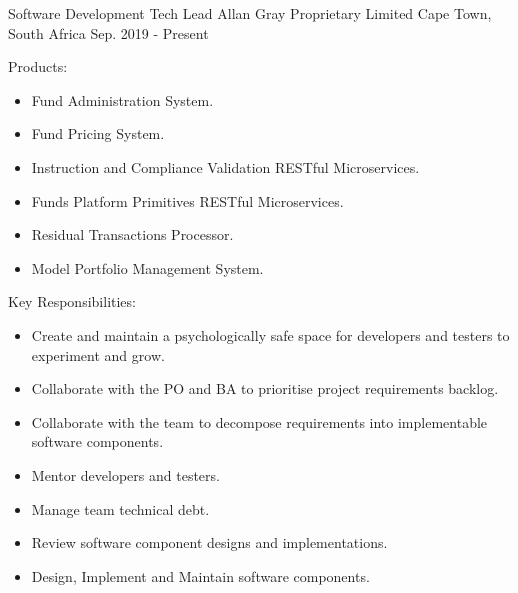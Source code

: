 

\begin{cventries}
  \cventry
    {Software Development Tech Lead} %
    {Allan Gray Proprietary Limited} %
    {Cape Town, South Africa} %
    {Sep. 2019 - Present} %
    {
      \begin{cvitems} %
        \item {Products:}
        \begin{itemize}
          \item {Fund Administration System.}
          \item {Fund Pricing System.}
          \item {Instruction and Compliance Validation RESTful Microservices.}
          \item {Funds Platform Primitives RESTful Microservices.}
          \item {Residual Transactions Processor.}
          \item {Model Portfolio Management System.}
        \end{itemize}
        \item {Key Responsibilities:}
        \begin{itemize}
          \item {Create and maintain a psychologically safe space for developers and testers to experiment and grow.}
          \item {Collaborate with the PO and BA to prioritise project requirements backlog.}
          \item {Collaborate with the team to decompose requirements into implementable software components.}
          \item {Mentor developers and testers.}
          \item {Manage team technical debt.}
          \item {Review software component designs and implementations.}
          \item {Design, Implement and Maintain software components.}
        \end{itemize}
      \end{cvitems}
    }


\end{cventries}
